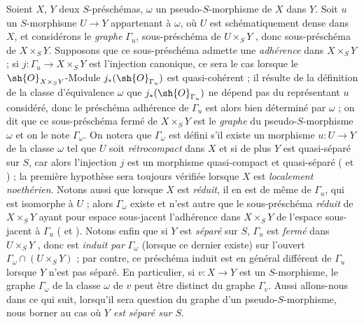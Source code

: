 \begin{env}[20.4.1]
Soient $X$, $Y$ deux $S$-préschémas, $\omega$ un pseudo-$S$-morphisme de $X$ dans $Y$.
Soit $u$ un $S$-morphisme $U\to Y$ appartenant à $\omega$, où $U$ est schématiquement dense dans $X$, et considérons le \emph{graphe} $\Gamma_u$, sous-préschéma de $U\times_S Y$ , donc sous-préschéma de $X\times_S Y$.
Supposons que ce sous-préschéma admette une \emph{adhérence}  dans $X\times_S Y$ ; si $j:\Gamma_u\to X\times_S Y$ est l'injection canonique, ce sera le cas lorsque le $\sh{O}_{X\times_S Y}$-Module $j_*(\sh{O}_{\Gamma_u})$ est quasi-cohérent ; il résulte de la définition de la classe d'équivalence $\omega$  que $j_*(\sh{O}_{\Gamma_u})$ ne dépend pas du représentant $u$ considéré, donc le préschéma adhérence de $\Gamma_u$ est alors bien déterminé par $\omega$ ; on dit que ce sous-préschéma fermé de $X\times_S Y$ est le \emph{graphe} du pseudo-$S$-morphisme $\omega$ et on le note $\Gamma_\omega$.
On notera que $\Gamma_\omega$ est défini s'il existe un morphisme $u:U\to Y$ de la classe $\omega$ tel que $U$ soit \emph{rétrocompact} dans $X$ et si de plus $Y$ est quasi-séparé sur $S$, car alors l'injection $j$ est un morphisme quasi-compact et quasi-séparé ( et ) ; la première hypothèse sera toujours vérifiée lorsque $X$ est \emph{localement noethérien}.
Notons aussi que lorsque $X$ est \emph{réduit}, il en est de même de $\Gamma_u$, qui est isomorphe à $U$  ; alors $\Gamma_\omega$ existe et n'est autre que le sous-préschéma \emph{réduit} de $X\times_S Y$ ayant pour espace sous-jacent l'adhérence dans $X\times_S Y$ de l'espace sous-jacent à $\Gamma_u$ ( et ).
Notons enfin que si $Y$ est \emph{séparé} sur $S$, $\Gamma_u$ est \emph{fermé} dans $U\times_S Y$ , donc est \emph{induit par} $\Gamma_\omega$ (lorsque ce dernier existe) sur l'ouvert $\Gamma_\omega\cap(U\times_S Y)$  ; par contre, ce préschéma induit est en général différent de $\Gamma_u$ lorsque $Y$ n'est pas séparé.
En particulier, si $v:X\to Y$ est un $S$-morphisme, le graphe $\Gamma_\omega$ de la classe $\omega$ de $v$ peut être distinct du graphe $\Gamma_v$.
Aussi allons-nous dans ce qui suit, lorsqu'il sera question du graphe d'un pseudo-$S$-morphisme, nous borner au cas où \emph{$Y$ est séparé sur $S$}.
\end{env}

